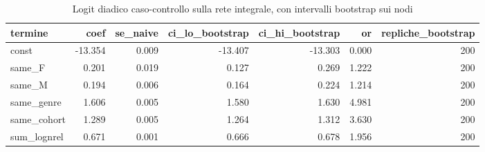 \begin{table}
\centering
\caption{Logit diadico caso-controllo sulla rete integrale, con intervalli bootstrap sui nodi}
\label{tab:t4_logit_diadico}
\begin{tabular}{lrrrrrr}
\toprule
    termine &    coef &  se\_naive &  ci\_lo\_bootstrap &  ci\_hi\_bootstrap &    or &  repliche\_bootstrap \\
\midrule
      const & -13.354 &     0.009 &          -13.407 &          -13.303 & 0.000 &                 200 \\
     same\_F &   0.201 &     0.019 &            0.127 &            0.269 & 1.222 &                 200 \\
     same\_M &   0.194 &     0.006 &            0.164 &            0.224 & 1.214 &                 200 \\
 same\_genre &   1.606 &     0.005 &            1.580 &            1.630 & 4.981 &                 200 \\
same\_cohort &   1.289 &     0.005 &            1.264 &            1.312 & 3.630 &                 200 \\
sum\_lognrel &   0.671 &     0.001 &            0.666 &            0.678 & 1.956 &                 200 \\
\bottomrule
\end{tabular}
\end{table}

